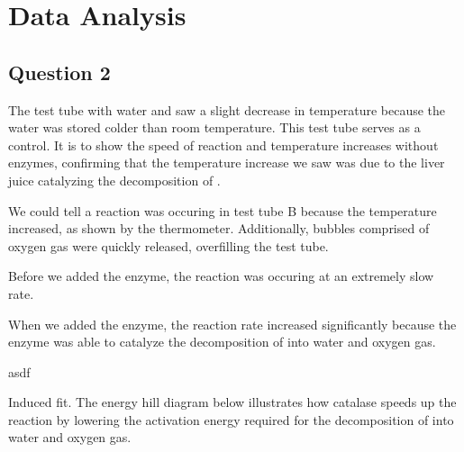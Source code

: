 \documentclass[12pt]{article}
\begin{document}
\section*{Data Analysis}

\subsection*{Question 2}
\begin{enumAlph}
    \item The test tube with water and  saw a slight decrease in temperature
    because the water was stored colder than room temperature. This test tube serves as a control. It is to show
    the speed of reaction and temperature increases without enzymes, 
    confirming that the temperature increase we saw
    was due to the liver juice catalyzing the decomposition of . 
    \item We could tell a reaction was occuring in test tube B 
    because the temperature increased, as shown by the thermometer.
    Additionally, bubbles comprised of oxygen gas were quickly released, overfilling
    the test tube.
    \item Before we added the enzyme, the reaction was occuring at 
    an extremely slow rate. 
    \item When we added the enzyme, the
    reaction rate increased significantly because the enzyme was able to
    catalyze the decomposition of  into water and oxygen gas.
    \item asdf
    \item Induced fit. The energy hill diagram below illustrates how catalase speeds up the reaction by lowering the activation energy required for the decomposition of  into water and oxygen gas.

    \begin{figure}[h]
        \centering
\end{figure}
\end{enumAlph}
\end{document}
